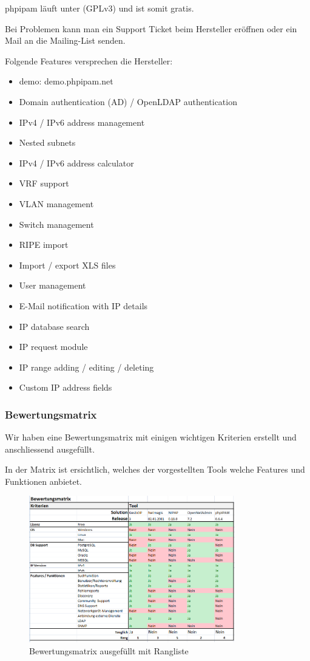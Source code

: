 \documentclass[11pt,a4paper,parskip=half]{scrartcl}
\begin{document}
phpipam läuft unter (GPLv3) und ist somit gratis.

Bei Problemen kann man ein Support Ticket beim Hersteller eröffnen oder ein Mail an die Mailing-List senden.

Folgende Features versprechen die Hersteller:
\begin{itemize}
\item{demo: demo.phpipam.net}
\item{Domain authentication (AD) / OpenLDAP authentication}
\item{IPv4 / IPv6 address management}
\item{Nested subnets}
\item{IPv4 / IPv6 address calculator}
\item{VRF support}
\item{VLAN management}
\item{Switch management}
\item{RIPE import}
\item{Import / export XLS files}
\item{User management}
\item{E-Mail notification with IP details}
\item{IP database search}
\item{IP request module}
\item{IP range adding / editing / deleting}
\item{Custom IP address fields}
\end{itemize}

\subsubsection{Bewertungsmatrix}
Wir haben eine Bewertungsmatrix mit einigen wichtigen Kriterien erstellt und anschliessend ausgefüllt.

In der Matrix ist ersichtlich, welches der vorgestellten Tools welche Features und Funktionen anbietet.
\begin{figure}[H]
\centering
\includegraphics[width=0.8\textwidth]{Phase3/Matrix_1.png}
\caption{Bewertungsmatrix ausgefüllt mit Rangliste}
\label{fig:matrix_1}
\end{figure}
\end{document}

